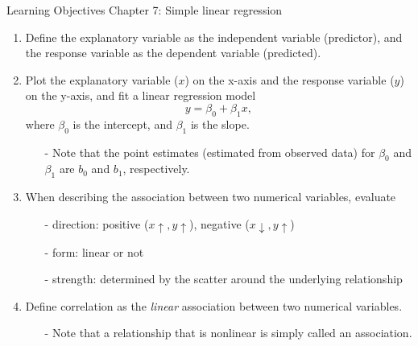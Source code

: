 \documentclass[11pt]{article}
\begin{document}
{\LARGE \textcolor{oiB}{Learning Objectives \hfill Chapter 7: Simple linear regression}} \\


%

\begin{enumerate}
\renewcommand\labelenumi{\textcolor{light}{\textbf{LO \theenumi.}}}

\item Define the explanatory variable as the independent variable (predictor), and the response variable as the dependent variable (predicted).

\item Plot the explanatory variable ($x$) on the x-axis and the response variable ($y$) on the y-axis, and fit a linear regression model
\[ y = \beta_0 + \beta_1 x,\]
where $\beta_0$ is the intercept, and $\beta_1$ is the slope.
\begin{itemize}
\item[-] Note that the point estimates (estimated from observed data) for $\beta_0$ and $\beta_1$ are $b_0$ and $b_1$, respectively.
\end{itemize}

\item When describing the association between two numerical variables, evaluate
\begin{itemize}
\item[-] direction: positive ($x \uparrow, y \uparrow$), negative ($x \downarrow, y \uparrow$)
\item[-] form: linear or not
\item[-] strength: determined by the scatter around the underlying relationship
\end{itemize}

\item Define correlation as the \emph{linear} association between two numerical variables.
\begin{itemize}
\item[-] Note that a relationship that is nonlinear is simply called an association.
\end{itemize}


\end{enumerate}
\end{document}
